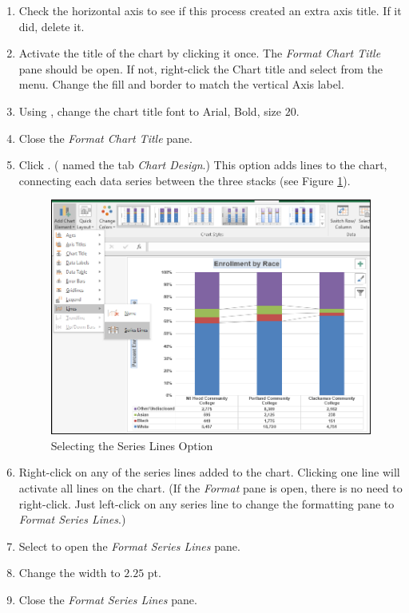 \begin{enumbox}
\begin{enumerate}
		\item Check the horizontal axis to see if this process created an extra axis title. If it did, delete it.
		\item Activate the title of the chart by clicking it once. The \textit{Format Chart Title} pane should be open. If not, right-click the Chart title and select  from the menu. Change the fill and border to match the vertical Axis label.
		\item Using , change the chart title font to Arial, Bold, size $ 20 $.
		\item Close the \textit{Format Chart Title} pane.
		\item Click . ( named the tab \textit{Chart Design}.) This option adds lines to the chart, connecting each data series between the three stacks (see Figure \ref{04:fig40}).
	
		\begin{figure}[H]
			\centering
			\includegraphics[width=\maxwidth{.95\linewidth}]{gfx/ch04_fig40}
			\caption{Selecting the Series Lines Option}
			\label{04:fig40}
		\end{figure}

		\item Right-click on any of the series lines added to the chart. Clicking one line will activate all lines on the chart. (If the \textit{Format} pane is open, there is no need to right-click. Just left-click on any series line to change the formatting pane to \textit{Format Series Lines}.)
		\item Select  to open the \textit{Format Series Lines} pane.
		\item Change the width to $ 2.25 $ pt.
		\item Close the \textit{Format Series Lines} pane.
	\end{enumerate}
\end{enumbox}

